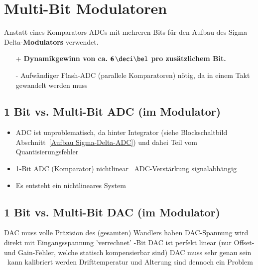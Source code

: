 
\section{Multi-Bit Modulatoren}

Anstatt eines Komparators ADCs mit mehreren Bits für den Aufbau des Sigma-Delta-\textbf{Modulators} verwendet.

\begin{minipage}[t]{0.48\columnwidth}
    \begin{itemize}
        \item[+] \textbf{Dynamikgewinn von ca. $\bm{6 \, \deci \bel }$ pro zusätzlichem Bit.}
    \end{itemize}
\end{minipage}
\hfill
\begin{minipage}[t]{0.48\columnwidth}
    \begin{itemize}
        \item[-] Aufwändiger Flash-ADC (parallele Komparatoren) nötig, da in einem Takt gewandelt werden muss
    \end{itemize}
\end{minipage}


\subsection{1 Bit vs. Multi-Bit ADC (im Modulator)}

\begin{itemize}
    \item ADC ist unproblematisch, da hinter Integrator (siehe Blockschaltbild Abschnitt~\ref{Aufbau Sigma-Delta-ADC}) und dahei 
        Teil vom Quantisierungsfehler
    \item 1-Bit ADC (Komparator) nichtlinear \textrightarrow\ ADC-Verstärkung signalabhängig
    \item Es entsteht ein nichtlineares System
\end{itemize}


\subsection{1 Bit vs. Multi-Bit DAC (im Modulator)}

\begin{outline}
    \1 DAC muss volle Präzision des (gesamten) Wandlers haben
        \2 DAC-Spannung wird direkt mit Eingangsspannung 'verrechnet'
    -Bit DAC ist perfekt linear (nur Offset- und Gain-Fehler, welche statisch kompensierbar sind)
    \1 DAC muss sehr genau sein \textrightarrow\ kann kalibriert werden
        \2 Drifttemperatur und Alterung sind dennoch ein Problem
\end{outline}


